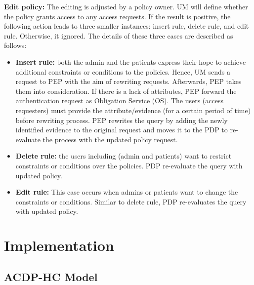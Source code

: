 \documentclass[conference]{IEEEtran}
\begin{document}
\textbf{Edit policy:}
The editing is adjusted by a policy owner.
UM will define whether the policy grants access to any access requests.
If the result is positive, the following action leads to three smaller instances: insert rule, delete rule, and edit rule. 
Otherwise, it ignored. 
The details of these three cases are described as follows:
\begin{itemize}
	\item \textbf{Insert rule: }both the admin and the patients express their hope to achieve additional constraints or conditions to the policies. 
	Hence, UM sends a request to PEP with the aim of rewriting requests. 
	Afterwards, PEP takes them into consideration. 
	If there is a lack of attributes, PEP forward the authentication request as Obligation Service (OS). 
	The users (access requesters) must provide the attribute/evidence (for a certain period of time) before rewriting process. 
	PEP rewrites the query by adding the newly identified evidence to the original request and moves it to the PDP to re-evaluate the process with the updated policy request.
	\item \textbf{Delete rule: } the users including (admin and patients) want to restrict constraints or conditions over the policies. 
	PDP re-evaluate the query with updated policy.
	\item \textbf{Edit rule: }This case occurs when admins or patients want to change the constraints or conditions. 
	Similar to delete rule, PDP re-evaluates the query with updated policy.
\end{itemize}

\section{Implementation}\label{sec:Imp}

\subsection{ACDP-HC Model}\label{model}
\end{document}
